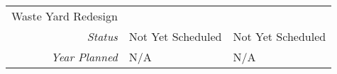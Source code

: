 \begin{tabularx}{\textwidth}{r|X|X|}
\multicolumn{1}{|V{.2\columnwidth}|}{\cellcolor{ccorangelight}Waste Yard Redesign}          &                                                                  &                                                                  \\
        \multicolumn{1}{|r|}{\cellcolor{ccorangelight}\textit{Status}}                & Not Yet Scheduled                                                         & Not Yet Scheduled                                                         \\
        \multicolumn{1}{|r|}{\cellcolor{ccorangelight}\textit{Year Planned}}                  & N/A                                                     & N/A                                                     \\ \hline
\end{tabularx}